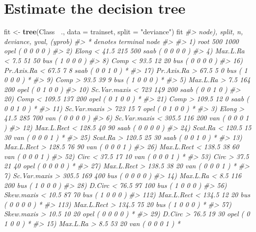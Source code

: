 \documentclass[]{book}
\newenvironment{Shaded}{\begin{snugshade}}{\end{snugshade}}
\newcommand{\CommentTok}[1]{\textcolor[rgb]{0.56,0.35,0.01}{\textit{#1}}}
\newcommand{\DataTypeTok}[1]{\textcolor[rgb]{0.13,0.29,0.53}{#1}}
\newcommand{\KeywordTok}[1]{\textcolor[rgb]{0.13,0.29,0.53}{\textbf{#1}}}
\newcommand{\NormalTok}[1]{#1}
\newcommand{\OperatorTok}[1]{\textcolor[rgb]{0.81,0.36,0.00}{\textbf{#1}}}
\newcommand{\StringTok}[1]{\textcolor[rgb]{0.31,0.60,0.02}{#1}}
\begin{document}
\hypertarget{estimate-the-decision-tree}{%
\section{Estimate the decision tree}\label{estimate-the-decision-tree}}

\begin{Shaded}
\begin{Highlighting}[]
\NormalTok{fit <-}\StringTok{ }\KeywordTok{tree}\NormalTok{(Class }\OperatorTok{~}\NormalTok{., }\DataTypeTok{data =}\NormalTok{ trainset, }\DataTypeTok{split =} \StringTok{"deviance"}\NormalTok{)}
\NormalTok{fit}
\CommentTok{#> node), split, n, deviance, yval, (yprob)}
\CommentTok{#>       * denotes terminal node}
\CommentTok{#> }
\CommentTok{#>   1) root 500 1000 opel ( 0 0 0 0 )  }
\CommentTok{#>     2) Elong < 41.5 215  500 saab ( 0 0 0 0 )  }
\CommentTok{#>       4) Max.L.Ra < 7.5 51   50 bus ( 1 0 0 0 )  }
\CommentTok{#>         8) Comp < 93.5 12   20 bus ( 0 0 0 0 )  }
\CommentTok{#>          16) Pr.Axis.Ra < 67.5 7    8 saab ( 0 0 1 0 ) *}
\CommentTok{#>          17) Pr.Axis.Ra > 67.5 5    0 bus ( 1 0 0 0 ) *}
\CommentTok{#>         9) Comp > 93.5 39    9 bus ( 1 0 0 0 ) *}
\CommentTok{#>       5) Max.L.Ra > 7.5 164  200 opel ( 0 1 0 0 )  }
\CommentTok{#>        10) Sc.Var.maxis < 723 149  200 saab ( 0 0 1 0 )  }
\CommentTok{#>          20) Comp < 109.5 137  200 opel ( 0 1 0 0 ) *}
\CommentTok{#>          21) Comp > 109.5 12    0 saab ( 0 0 1 0 ) *}
\CommentTok{#>        11) Sc.Var.maxis > 723 15    7 opel ( 0 1 0 0 ) *}
\CommentTok{#>     3) Elong > 41.5 285  700 van ( 0 0 0 0 )  }
\CommentTok{#>       6) Sc.Var.maxis < 305.5 116  200 van ( 0 0 0 1 )  }
\CommentTok{#>        12) Max.L.Rect < 128.5 40   90 saab ( 0 0 0 0 )  }
\CommentTok{#>          24) Scat.Ra < 120.5 15   30 van ( 0 0 0 1 ) *}
\CommentTok{#>          25) Scat.Ra > 120.5 25   30 saab ( 0 0 1 0 ) *}
\CommentTok{#>        13) Max.L.Rect > 128.5 76   90 van ( 0 0 0 1 )  }
\CommentTok{#>          26) Max.L.Rect < 138.5 38   60 van ( 0 0 0 1 )  }
\CommentTok{#>            52) Circ < 37.5 17   10 van ( 0 0 0 1 ) *}
\CommentTok{#>            53) Circ > 37.5 21   40 opel ( 0 0 0 0 ) *}
\CommentTok{#>          27) Max.L.Rect > 138.5 38   20 van ( 0 0 0 1 ) *}
\CommentTok{#>       7) Sc.Var.maxis > 305.5 169  400 bus ( 0 0 0 0 )  }
\CommentTok{#>        14) Max.L.Ra < 8.5 116  200 bus ( 1 0 0 0 )  }
\CommentTok{#>          28) D.Circ < 76.5 97  100 bus ( 1 0 0 0 )  }
\CommentTok{#>            56) Skew.maxis < 10.5 87   70 bus ( 1 0 0 0 )  }
\CommentTok{#>             112) Max.L.Rect < 134.5 12   20 bus ( 0 0 0 0 ) *}
\CommentTok{#>             113) Max.L.Rect > 134.5 75   20 bus ( 1 0 0 0 ) *}
\CommentTok{#>            57) Skew.maxis > 10.5 10   20 opel ( 0 0 0 0 ) *}
\CommentTok{#>          29) D.Circ > 76.5 19   30 opel ( 0 1 0 0 ) *}
\CommentTok{#>        15) Max.L.Ra > 8.5 53   20 van ( 0 0 0 1 ) *}
\end{Highlighting}
\end{Shaded}
\end{document}
